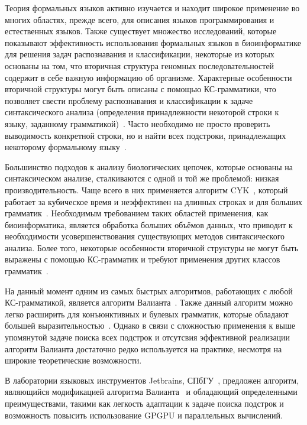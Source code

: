 \documentclass[14pt]{matmex-diploma-custom}
\begin{document}
Теория формальных языков активно изучается и находит широкое применение во многих областях, прежде всего, для описания языков программирования и естественных языков. 
Также существует множество исследований, которые показывают эффективность использования формальных языков в биоинформатике  для решения задач распознавания и классификации, некоторые из которых основаны на том, что вторичная структура геномных последовательностей содержит в себе важную информацию об организме. 
Характерные особенности вторичной структуры могут быть описаны с помощью КС-грамматики, что позволяет свести проблему распознавания и классификации к задаче синтаксического анализа (определения принадлежности некоторой строки к языку, заданному грамматикой)~\cite{knudsen1999rna, dowell2004evaluation, rivas2000language}. 
Часто необходимо не просто проверить выводимость конкретной строки, но и найти всех подстроки, принадлежащих некоторому формальному языку~\cite{durbin1996biological}.

Большинство подходов к анализу биологических цепочек, которые основаны на синтаксическом анализе, сталкиваются с одной и той же проблемой: низкая производительность. 
Чаще всего в них применяется алгоритм CYK~\cite{kasami1966efficient, Younger:1966:CLP:1441427.1442019}, который работает за кубическое время и неэффективен на длинных строках и для больших грамматик~\cite{liu2005parallel}. 
Необходимым требованием таких областей применения, как биоинформатика, является обработка больших объёмов данных, что приводит к необходимости усовершенствования существующих методов синтаксического анализа.
Более того, некоторые особенности вторичной структуры не могут быть выражены с помощью КС-грамматик и требуют применения других классов грамматик~\cite{zier2013rna}.

На данный момент одним из самых быстрых алгоритмов, работающих с любой КС-грамматикой, является алгоритм Валианта~\cite{Valiant:1975:GCR:1739932.1740048}. 
Также данный алгоритм можно легко расширить для конъюнктивных и булевых грамматик, которые обладают большей выразительностью~\cite{Okhotin:2014:PMM:2565359.2565379}. 
Однако в связи с сложностью  применения к выше упомянутой задаче поиска всех подстрок и отсутсвия эффективной реализации алгоритм Валианта достаточно редко используется на практике, несмотря на широкие теоретические возможности.

В лаборатории языковых инструментов Jetbrains, СПбГУ~\cite{jetbrains}, предложен алгоритм, являющийся модификацией алгоритма Валианта~\cite{alg} и обладающий определенными преимуществами, такими как легкость адаптации к задаче поиска подстрок и возможность повысить использование GPGPU и параллельных вычислений.
\end{document}

